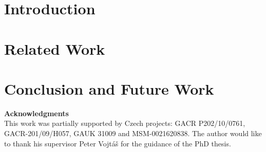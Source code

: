 \documentclass[runningheads,a4paper]{llncs}
\begin{document}
\section{Introduction}



\section{Related Work}

\section{Conclusion and Future Work}

\bigskip
\noindent\textbf{Acknowledgments}\\
This work was partially supported by Czech projects: GACR P202/10/0761, GACR-201/09/H057, GAUK 31009 and MSM-0021620838.
The author would like to thank his supervisor Peter Vojt\'{a}\v{s} for the guidance of the PhD thesis.






\end{document}
